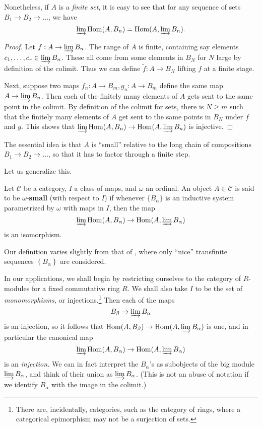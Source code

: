 Nonetheless, if $A$ is a \emph{finite set}, it is easy to see that for any
sequence of sets $B_1 \to B_2 \to \dots$, we have
\[ \varinjlim \hom(A, B_n) = \hom(A, \varinjlim B_n).  \]
\begin{proof} 
Let $f: A \to \varinjlim B_n$. The range of $A$ is finite, containing say
elements $c_1, \dots, c_r \in \varinjlim B_n$. These all come from some
elements in $B_N$ for $N$ large by definition of the colimit. Thus we can
define $\widetilde{f}: A \to B_N$ lifting $f$ at a finite stage.

Next, suppose two  maps $f_n: A \to B_m,
g_n : A \to B_m$  define the same map $A \to \varinjlim B_n$.
Then each of the finitely many elements of $A$ gets sent to the same point in
the colimit. By definition of the colimit for sets, there is $N \geq m$ such
that the finitely many elements of $A$ get sent to the same points in $B_N$
under $f$ and $g$. This shows that $\varinjlim \hom(A, B_n) \to \hom(A,
\varinjlim B_n)$ is injective.
\end{proof} 


The essential idea is that $A$ is ``small'' relative to the long chain of
compositions $B_1 \to B_2 \to \dots$, so that it has to factor through a
finite step.

Let us generalize this.

\begin{definition}  \label{smallness}
Let $\mathcal{C}$ be a category, $I $ a class of maps, and $\omega$ an ordinal.
An object $A \in \mathcal{C}$ is said to be $\omega$-\textbf{small} (with
respect to $I$) if
whenever $\{B_\alpha\}$ is an inductive system parametrized by $\omega$ with
maps in $I$, then
the map
\[ \varinjlim \hom(A, B_\alpha) \to \hom(A, \varinjlim B_\alpha)  \]
is an isomorphism. 
\end{definition} 

Our definition varies slightly from that of \cite{Ho07}, where only ``nice''
transfinite sequences $\left\{B_\alpha\right\}$ are considered.

In our applications, we shall begin by restricting ourselves to the category
of $R$-modules for a fixed commutative ring $R$.
We shall also take $I$ to be the set of \emph{monomorphisms,} or
injections.\footnote{There are, incidentally, categories, such as the category
of rings, where a categorical epimorphism may not be a surjection of sets.}
Then each of the maps
\[ B_\beta \to \varinjlim B_\alpha  \]
is an injection, so it follows that 
$\hom(A, B_\beta )\to \hom (A, \varinjlim  B_\alpha)$ is one, and in
particular the canonical map
\begin{equation} \label{homcolimmap} \varinjlim \hom(A, B_\alpha) \to \hom (A,
\varinjlim  B_\alpha)  \end{equation}
is an \emph{injection.}
We can in fact interpret the $B_\alpha$'s as subobjects of the big module
$\varinjlim B_\alpha$, and think of their union as $\varinjlim B_\alpha$.
(This is not an abuse of notation if we identify $B_\alpha$ with the image in
the colimit.)

